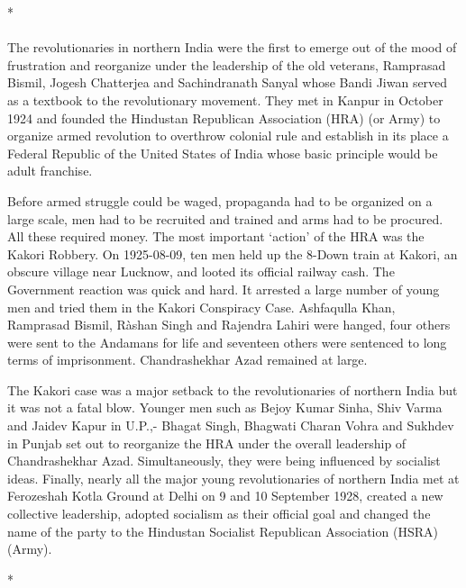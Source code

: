 \begin{multicols}{2}
\begin{center}*\end{center}

\paragraph*{}

The revolutionaries in northern India were the first to emerge out of the mood of frustration and reorganize under the leadership of the old veterans, Ramprasad Bismil, Jogesh Chatterjea and Sachindranath Sanyal whose Bandi Jiwan served as a textbook to the revolutionary movement. They met in Kanpur in October 1924 and founded the Hindustan Republican Association (HRA) (or Army) to organize armed revolution to overthrow colonial rule and establish in its place a Federal Republic of the United States of India whose basic principle would be adult franchise.

Before armed struggle could be waged, propaganda had to be organized on a large scale, men had to be recruited and trained and arms had to be procured. All these required money. The most important `action' of the HRA was the Kakori Robbery. On 1925-08-09, ten men held up the 8-Down train at Kakori, an obscure village near Lucknow, and looted its official railway cash. The Government reaction was quick and hard. It arrested a large number of young men and tried them in the Kakori Conspiracy Case. Ashfaqulla Khan, Ramprasad Bismil, Ràshan Singh and Rajendra Lahiri were hanged, four others were sent to the Andamans for life and seventeen others were sentenced to long terms of imprisonment. Chandrashekhar Azad remained at large.

The Kakori case was a major setback to the revolutionaries of northern India but it was not a fatal blow. Younger men such as Bejoy Kumar Sinha, Shiv Varma and Jaidev Kapur in U.P.,- Bhagat Singh, Bhagwati Charan Vohra and Sukhdev in Punjab set out to reorganize the HRA under the overall leadership of Chandrashekhar Azad. Simultaneously, they were being influenced by socialist ideas. Finally, nearly all the major young revolutionaries of northern India met at Ferozeshah Kotla Ground at Delhi on 9 and 10 September 1928, created a new collective leadership, adopted socialism as their official goal and changed the name of the party to the Hindustan Socialist Republican Association (HSRA) (Army).

\begin{center}*\end{center}


\end{multicols}
